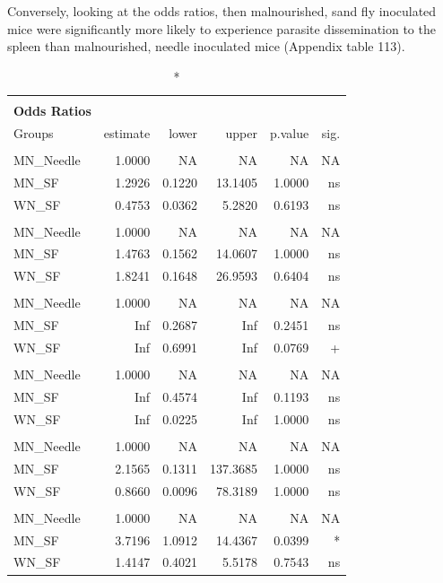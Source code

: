 \documentclass[
  12pt,
  letterpaper,
]{article}
\begin{document}
Conversely, looking at the odds ratios, then malnourished, sand fly inoculated mice were significantly more likely to experience parasite dissemination to the spleen than malnourished, needle inoculated mice (Appendix table 113).

\begin{longtable}{l|rrrrr}
\caption*{
{\large \textbf{Appendix Table 113}} \\ 
{\small \textbf{Odds Ratios}}
} \\ 
\toprule
\multicolumn{1}{l}{Groups} & estimate & lower & upper & p.value & sig. \\ 
\midrule\addlinespace[2.5pt]
\multicolumn{6}{l}{Brain} \\ 
\midrule\addlinespace[2.5pt]
MN\_Needle & 1.0000 & NA & NA & NA & NA \\ 
MN\_SF & 1.2926 & 0.1220 & 13.1405 & 1.0000 & ns \\ 
WN\_SF & 0.4753 & 0.0362 & 5.2820 & 0.6193 & ns \\ 
\midrule\addlinespace[2.5pt]
\multicolumn{6}{l}{Ear} \\ 
\midrule\addlinespace[2.5pt]
MN\_Needle & 1.0000 & NA & NA & NA & NA \\ 
MN\_SF & 1.4763 & 0.1562 & 14.0607 & 1.0000 & ns \\ 
WN\_SF & 1.8241 & 0.1648 & 26.9593 & 0.6404 & ns \\ 
\midrule\addlinespace[2.5pt]
\multicolumn{6}{l}{Eye} \\ 
\midrule\addlinespace[2.5pt]
MN\_Needle & 1.0000 & NA & NA & NA & NA \\ 
MN\_SF & Inf & 0.2687 & Inf & 0.2451 & ns \\ 
WN\_SF & Inf & 0.6991 & Inf & 0.0769 & + \\ 
\midrule\addlinespace[2.5pt]
\multicolumn{6}{l}{Liver} \\ 
\midrule\addlinespace[2.5pt]
MN\_Needle & 1.0000 & NA & NA & NA & NA \\ 
MN\_SF & Inf & 0.4574 & Inf & 0.1193 & ns \\ 
WN\_SF & Inf & 0.0225 & Inf & 1.0000 & ns \\ 
\midrule\addlinespace[2.5pt]
\multicolumn{6}{l}{Paw} \\ 
\midrule\addlinespace[2.5pt]
MN\_Needle & 1.0000 & NA & NA & NA & NA \\ 
MN\_SF & 2.1565 & 0.1311 & 137.3685 & 1.0000 & ns \\ 
WN\_SF & 0.8660 & 0.0096 & 78.3189 & 1.0000 & ns \\ 
\midrule\addlinespace[2.5pt]
\multicolumn{6}{l}{Spleen} \\ 
\midrule\addlinespace[2.5pt]
MN\_Needle & 1.0000 & NA & NA & NA & NA \\ 
MN\_SF & 3.7196 & 1.0912 & 14.4367 & 0.0399 & * \\ 
WN\_SF & 1.4147 & 0.4021 & 5.5178 & 0.7543 & ns \\ 
\bottomrule
\end{longtable}
\end{document}
